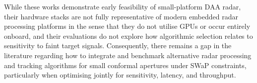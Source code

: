 While these works demonstrate early feasibility of small-platform DAA radar, their hardware stacks are not fully representative of modern embedded radar processing platforms in the sense that they do not utilise GPUs or occur entirely onboard, and their evaluations do not explore how algorithmic selection relates to sensitivity to faint target signals. Consequently, there remains a gap in the literature regarding how to integrate and benchmark alternative radar processing and tracking algorithms for small conformal apertures under SWaP constraints, particularly when optimising jointly for sensitivity, latency, and throughput. 
